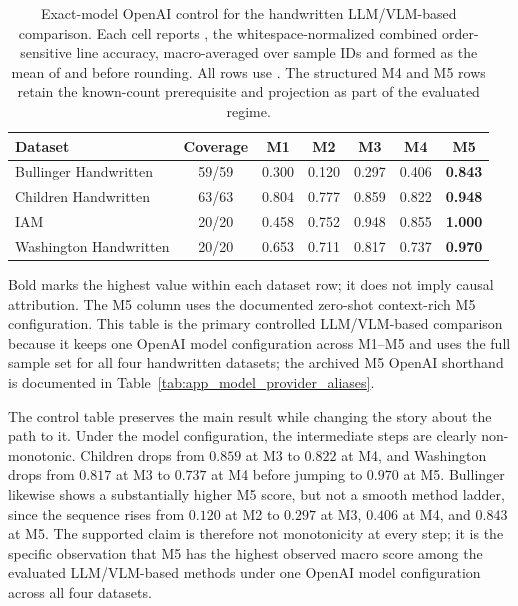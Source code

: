 \begin{table}[H]
  \centering
  \caption{Exact-model OpenAI control for the handwritten LLM/VLM-based comparison. Each cell reports \LANormCombined{}, the whitespace-normalized combined order-sensitive line accuracy, macro-averaged over sample IDs and formed as the mean of \LANormForward{} and \LANormReverse{} before rounding. All rows use \GPTFiveMarchShort{}. The structured M4 and M5 rows retain the known-count prerequisite and projection as part of the evaluated regime.}
  \label{tab:exp_handwritten_controlled_model}
  \footnotesize
  \begin{tabular}{@{}l c c c c c c@{}}
    \toprule
    \textbf{Dataset} & \textbf{Coverage} & \textbf{M1} & \textbf{M2} & \textbf{M3} & \textbf{M4} & \textbf{M5} \\
    \midrule
    Bullinger Handwritten & 59/59 & 0.300 & 0.120 & 0.297 & 0.406 & \textbf{0.843} \\
    Children Handwritten & 63/63 & 0.804 & 0.777 & 0.859 & 0.822 & \textbf{0.948} \\
    IAM & 20/20 & 0.458 & 0.752 & 0.948 & 0.855 & \textbf{1.000} \\
    Washington Handwritten & 20/20 & 0.653 & 0.711 & 0.817 & 0.737 & \textbf{0.970} \\
    \bottomrule
  \end{tabular}
  \vspace{0.35em}

  \parbox{0.82\linewidth}{\footnotesize Bold marks the highest value within each dataset row; it does not imply causal attribution. The M5 column uses the documented zero-shot context-rich M5 configuration. This table is the primary controlled LLM/VLM-based comparison because it keeps one OpenAI model configuration across M1--M5 and uses the full sample set for all four handwritten datasets; the archived M5 OpenAI shorthand is documented in Table~\ref{tab:app_model_provider_aliases}.}
\end{table}

The control table preserves the main result while changing the story about the path to it. Under the \GPTFiveMarchShort{} model configuration, the intermediate steps are clearly non-monotonic. Children drops from \(0.859\) at M3 to \(0.822\) at M4, and Washington drops from \(0.817\) at M3 to \(0.737\) at M4 before jumping to \(0.970\) at M5. Bullinger likewise shows a substantially higher M5 score, but not a smooth method ladder, since the sequence rises from \(0.120\) at M2 to \(0.297\) at M3, \(0.406\) at M4, and \(0.843\) at M5. The supported claim is therefore not monotonicity at every step; it is the specific observation that M5 has the highest observed macro score among the evaluated LLM/VLM-based methods under one OpenAI model configuration across all four datasets.

